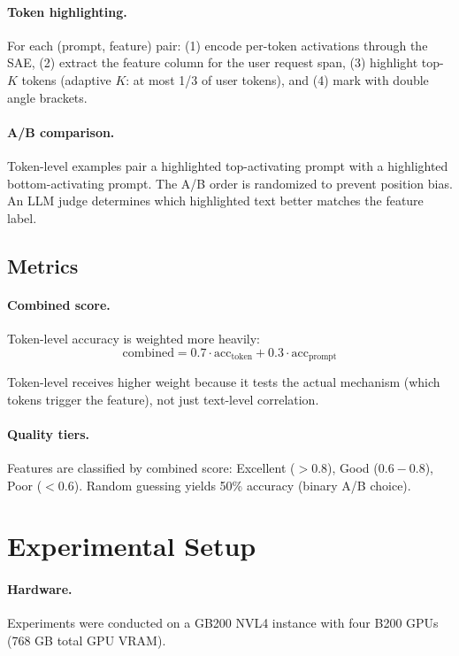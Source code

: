 \documentclass[runningheads]{llncs}
\begin{document}
\paragraph{Token highlighting.} For each (prompt, feature) pair: (1) encode per-token activations through the SAE, (2) extract the feature column for the user request span, (3) highlight top-$K$ tokens (adaptive $K$: at most 1/3 of user tokens), and (4) mark with double angle brackets.

\paragraph{A/B comparison.} Token-level examples pair a highlighted top-activating prompt with a highlighted bottom-activating prompt. The A/B order is randomized to prevent position bias. An LLM judge determines which highlighted text better matches the feature label.

\subsection{Metrics}

\paragraph{Combined score.} Token-level accuracy is weighted more heavily:
\begin{equation}
\text{combined} = 0.7 \cdot \text{acc}_\text{token} + 0.3 \cdot \text{acc}_\text{prompt}
\end{equation}

Token-level receives higher weight because it tests the actual mechanism (which tokens trigger the feature), not just text-level correlation.

\paragraph{Quality tiers.} Features are classified by combined score: Excellent ($> 0.8$), Good ($0.6 - 0.8$), Poor ($< 0.6$). Random guessing yields 50\% accuracy (binary A/B choice).


\section{Experimental Setup}
\label{sec:experiments}

\paragraph{Hardware.} Experiments were conducted on a GB200 NVL4 instance with four B200 GPUs (768 GB total GPU VRAM).
\end{document}
